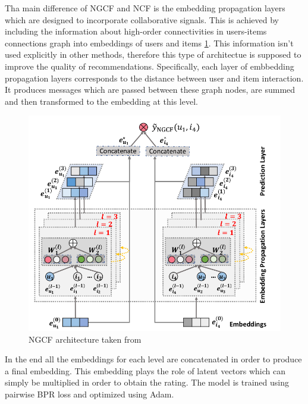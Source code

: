 
Tha main difference of NGCF \cite{wang2019neural} and NCF is the embedding propagation layers which are 
designed to incorporate collaborative signals.
This is achieved by including the information about high-order connectivities 
in users-items connections graph into embeddings of users and items \ref{fig:ngcf}.
This information isn't used explicitly in other methods, therefore this type 
of architectue is supposed to improve the quality of recommendations.
Specifically, each layer of embbedding propagation layers corresponds 
to the distance between user and item interaction. It produces messages which 
are passed between these graph nodes, are summed and then transformed to the 
embedding at this level.
\begin{figure}[h]
    \centering
    \includegraphics[width=0.8\linewidth]{images/ngcf.png}
    \caption{NGCF architecture taken from \cite{wang2019neural}}
    \label{fig:ngcf}
\end{figure}
In the end all the embeddings for each level are concatenated in order to produce a final embedding.
This embedding plays the role of latent vectors which can simply be multiplied in order to obtain the rating.
The model is trained using pairwise BPR loss and optimized using Adam.